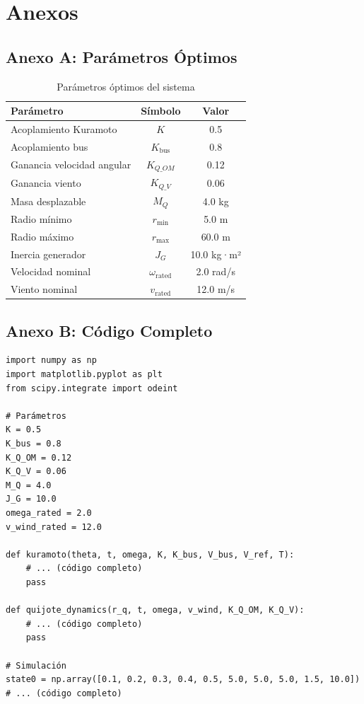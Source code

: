 \documentclass[12pt,a4paper]{article}
\begin{document}
\section{Anexos}

\subsection{Anexo A: Parámetros Óptimos}

\begin{table}[H]
\centering
\caption{Parámetros óptimos del sistema}
\label{tab:parametros_optimos}
\begin{tabular}{@{}lcc@{}}
\toprule
\textbf{Parámetro} & \textbf{Símbolo} & \textbf{Valor} \\
\midrule
Acoplamiento Kuramoto & $K$ & 0.5 \\
Acoplamiento bus & $K_{\text{bus}}$ & 0.8 \\
Ganancia velocidad angular & $K_{Q\_OM}$ & 0.12 \\
Ganancia viento & $K_{Q\_V}$ & 0.06 \\
Masa desplazable & $M_Q$ & 4.0 kg \\
Radio mínimo & $r_{\text{min}}$ & 5.0 m \\
Radio máximo & $r_{\text{max}}$ & 60.0 m \\
Inercia generador & $J_G$ & 10.0 kg·m² \\
Velocidad nominal & $\omega_{\text{rated}}$ & 2.0 rad/s \\
Viento nominal & $v_{\text{rated}}$ & 12.0 m/s \\
\bottomrule
\end{tabular}
\end{table}

\subsection{Anexo B: Código Completo}

\begin{lstlisting}[style=python, caption={Código completo del módulo autoregulante}]
import numpy as np
import matplotlib.pyplot as plt
from scipy.integrate import odeint

# Parámetros
K = 0.5
K_bus = 0.8
K_Q_OM = 0.12
K_Q_V = 0.06
M_Q = 4.0
J_G = 10.0
omega_rated = 2.0
v_wind_rated = 12.0

def kuramoto(theta, t, omega, K, K_bus, V_bus, V_ref, T):
    # ... (código completo)
    pass

def quijote_dynamics(r_q, t, omega, v_wind, K_Q_OM, K_Q_V):
    # ... (código completo)
    pass

# Simulación
state0 = np.array([0.1, 0.2, 0.3, 0.4, 0.5, 5.0, 5.0, 5.0, 1.5, 10.0])
# ... (código completo)
\end{lstlisting}
\end{document}

